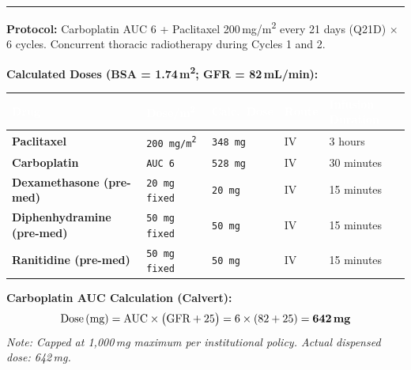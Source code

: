 \documentclass[11pt,a4paper]{scrartcl}
\newcommand{\sectionrule}{%
  \par\vspace{2pt}\noindent%
  {\color{TealAccent}\rule{\linewidth}{1.5pt}}\par\par%
  \vspace{4pt}%
}
\newcommand{\drugname}[1]{\textbf{\textcolor{NavyDeep}{#1}}}
\newcommand{\dose}[1]{\texttt{\textcolor{TealAccent}{#1}}}
\begin{document}
\par
\vspace{4mm}


\sectionrule

\begin{tcolorbox}[protocolbox, title={\faCapsules\quad Regimen: Carboplatin + Paclitaxel (CarboTax)}]

\footnotesize

\textbf{\textcolor{NavyDeep}{Protocol:}} Carboplatin AUC 6 + Paclitaxel 200\,mg/m\textsuperscript{2} every 21 days (Q21D) $\times$ 6 cycles.
Concurrent thoracic radiotherapy during Cycles 1 and 2.

\vspace{5pt}

\noindent\textbf{\textcolor{NavyDeep}{Calculated Doses} (BSA = 1.74\,m\textsuperscript{2}; GFR = 82\,mL/min):}

\vspace{3pt}

\begin{tabularx}{\linewidth}{@{} l C{2.0cm} C{2.2cm} C{2.0cm} C{2.8cm} @{}}
  \toprule
  \textcolor{white}{\bfseries Drug} &
  \textcolor{white}{\bfseries Dose/m\textsuperscript{2}} &
  \textcolor{white}{\bfseries Calc.\ Dose} &
  \textcolor{white}{\bfseries Route} &
  \textcolor{white}{\bfseries Infusion Duration} \\
  \midrule
  \drugname{Paclitaxel}   & \dose{200\,mg/m\textsuperscript{2}} & \dose{348\,mg}  & IV & 3 hours \\
  \drugname{Carboplatin}  & \dose{AUC\,6}                       & \dose{528\,mg}  & IV & 30 minutes \\
  \drugname{Dexamethasone (pre-med)} & \dose{20\,mg fixed}  & \dose{20\,mg}   & IV & 15 minutes \\
  \drugname{Diphenhydramine (pre-med)} & \dose{50\,mg fixed} & \dose{50\,mg}  & IV & 15 minutes \\
  \drugname{Ranitidine (pre-med)} & \dose{50\,mg fixed}     & \dose{50\,mg}   & IV & 15 minutes \\
  \bottomrule
\end{tabularx}

\vspace{6pt}

\textbf{\textcolor{NavyDeep}{Carboplatin AUC Calculation (Calvert):}}
\[
  \text{Dose\,(mg)} = \text{AUC} \times \bigl(\text{GFR} + 25\bigr) = 6 \times (82 + 25) = \mathbf{642\,mg}
\]
\textit{\textcolor{TextMuted}{\footnotesize Note: Capped at 1,000\,mg maximum per institutional policy. Actual dispensed dose: 642\,mg.}}

\end{tcolorbox}
\end{document}
